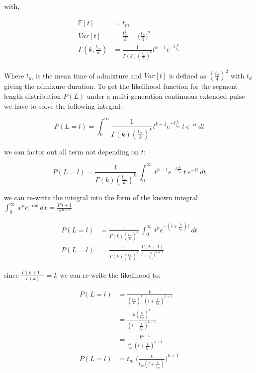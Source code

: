 \documentclass[]{article}
\begin{document}
with,

\begin{equation}
\begin{split}
\label{eq:RV_extended_pulse_properties}
\mathbb{E}[t]&=t_{m} \\
Var[t]&=\frac{t_{m}^2}{k} = \bigg(\frac{t_d}{4} \bigg)^2  \\
\Gamma(k,\frac{t_m}{k})&= \frac{1}{\Gamma(k)(\frac{t_m}{k})^k}t^{k-1}e^{-t\frac{k}{t_m}}
\end{split}
\end{equation}

Where $t_{m}$ is the mean time of admixture and $Var[t]$ is defined as $(\frac{t_d}{4})^2$ with $t_{d}$ giving the admixure duration.
To get the likelihood function for the segment length distribution $P(L)$ under a multi-generation continuous extended pulse we have to solve the following integral:

\begin{equation}
\label{eq:Likelihood_function_extended_pulse_1}
    P(L=l) = \int_{0}^{\infty} \frac{1}{\Gamma(k)(\frac{t_m}{k})^k}t^{k-1}e^{-t\frac{k}{t_m}}\ t\ e^{-tl} \ dt 
\end{equation}

we can factor out all term not depending on $t$:

\begin{equation}
\label{eq:Likelihood_function_extended_pulse_2}
    P(L=l) = \frac{1}{\Gamma(k)(\frac{t_m}{k})^k}\ \int_{0}^{\infty}\ t^{k-1}e^{-t\frac{k}{t_m}}\ t\ e^{-tl} \ dt 
\end{equation}

we can re-write the integral into the  form of the known integral $\int_{0}^{\infty}\ x^n e^{-\alpha x} \ dx= \frac{\Gamma{n+1}}{\alpha^{n+1}}$

\begin{equation}
\begin{split}
\label{eq:Likelihood_function_extended_pulse_3}
    P(L=l) &= \frac{1}{\Gamma(k)(\frac{t_m}{k})^k}\ \int_{0}^{\infty}\ t^{k}e^{-(l+\frac{k}{t_m})t} \ dt \\ 
    P(L=l) &= \frac{1}{\Gamma(k)(\frac{t_m}{k})^k}\ \frac{\Gamma(k+1)}{l+\frac{k}{t_m})^{k+1}} 
\end{split}
\end{equation}

since $\frac{\Gamma(k+1)}{\Gamma(k)} =k$ we can re-write the likelihood to:

\begin{equation}
\begin{split}
\label{eq:Likelihood_function_extended_pulse_final}
    P(L=l) &= \frac{k}{(\frac{t_m}{k})^k \ (l+\frac{k}{t_m})^{k+1}} \\
    &= \frac{k(\frac{k}{t_m})^k} {(l+\frac{k}{t_{m}})^{k+1}}  \\
    &= \frac{k^{k+1}} { t_{m}^k \ (l+\frac{k}{t_{m}})^{k+1}}  \\
    P(L=l) &= t_{m} \ \Bigg( \frac{k}{t_{m}(l+\frac{k}{t_{m}})}\Bigg)^{k+1}
\end{split}
\end{equation}
\end{document}
